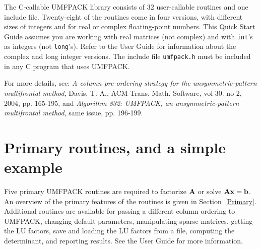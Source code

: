\documentclass[11pt]{article}
\newcommand{\m}[1]{{\bf{#1}}}       %
\begin{document}
The C-callable UMFPACK library consists of 32 user-callable routines and one
include file.  Twenty-eight of the routines come in four versions, with
different sizes of integers and for real or complex floating-point numbers.
This Quick Start Guide assumes you are working with real matrices
(not complex) and with {\tt int}'s as integers (not {\tt long}'s).
Refer to the User Guide for information about the complex and
long integer versions.  The include file {\tt umfpack.h}
must be included in any C program that uses UMFPACK.

For more details, see:
{\em A column pre-ordering strategy for the unsymmetric-pattern multifrontal method},
Davis, T. A.,
ACM Trans. Math. Software, vol 30. no 2, 2004, pp. 165-195, and
{\em Algorithm 832:  {UMFPACK}, an unsymmetric-pattern multifrontal method},
same issue, pp. 196-199.

\section{Primary routines, and a simple example}

Five primary UMFPACK routines are required to factorize $\m{A}$ or
solve $\m{Ax}=\m{b}$.  An overview of the primary features of the routines
is given in Section~\ref{Primary}.
Additional routines are available for passing a different column ordering
to UMFPACK, changing default parameters, manipulating sparse matrices,
getting the LU factors, save and loading the LU factors from a file,
computing the determinant,
and reporting results.  See the User Guide for more information.
\end{document}
